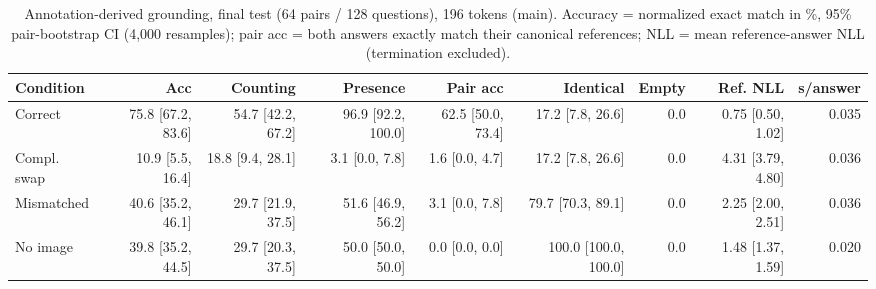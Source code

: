 \begin{table}[t]
\centering
\small
\caption{Annotation-derived grounding, final test (64 pairs / 128 questions), 196 tokens (main). Accuracy = normalized exact match in \%, 95\% pair-bootstrap CI (4,000 resamples); pair acc = both answers exactly match their canonical references; NLL = mean reference-answer NLL (termination excluded).}
\label{tab:t2_t2_final_grounding_main}
\begin{tabular}{lrrrrrrrr}
\toprule
Condition & Acc & Counting & Presence & Pair acc & Identical & Empty & Ref. NLL & s/answer \\
\midrule
Correct & 75.8 [67.2, 83.6] & 54.7 [42.2, 67.2] & 96.9 [92.2, 100.0] & 62.5 [50.0, 73.4] & 17.2 [7.8, 26.6] & 0.0 & 0.75 [0.50, 1.02] & 0.035 \\
Compl. swap & 10.9 [5.5, 16.4] & 18.8 [9.4, 28.1] & 3.1 [0.0, 7.8] & 1.6 [0.0, 4.7] & 17.2 [7.8, 26.6] & 0.0 & 4.31 [3.79, 4.80] & 0.036 \\
Mismatched & 40.6 [35.2, 46.1] & 29.7 [21.9, 37.5] & 51.6 [46.9, 56.2] & 3.1 [0.0, 7.8] & 79.7 [70.3, 89.1] & 0.0 & 2.25 [2.00, 2.51] & 0.036 \\
No image & 39.8 [35.2, 44.5] & 29.7 [20.3, 37.5] & 50.0 [50.0, 50.0] & 0.0 [0.0, 0.0] & 100.0 [100.0, 100.0] & 0.0 & 1.48 [1.37, 1.59] & 0.020 \\
\bottomrule
\end{tabular}
\end{table}
